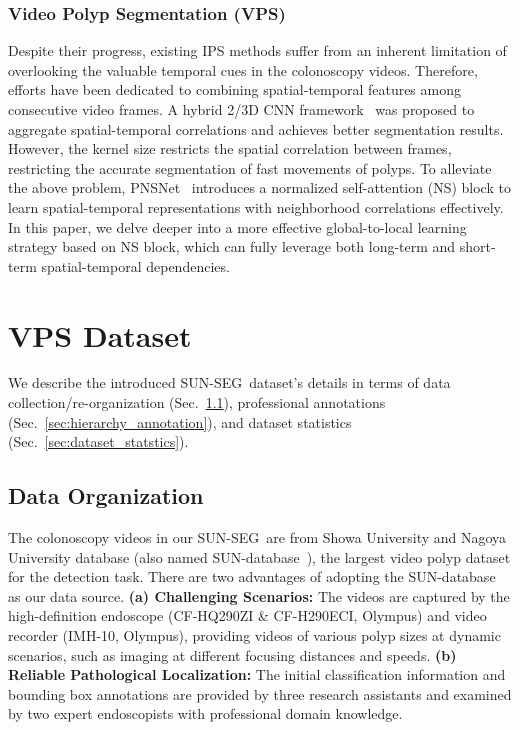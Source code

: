 \documentclass[default,iicol]{sn-jnl}
\theoremstyle{thmstyleone}
\theoremstyle{thmstyletwo}
\theoremstyle{thmstylethree}
\newcommand{\secref}[1]{Sec.~\ref{#1}}
\def\ourdataset{SUN-SEG}
\begin{document}
\subsubsection{Video Polyp Segmentation (VPS)}
Despite their progress, existing IPS methods suffer from an inherent limitation of overlooking the valuable temporal cues in the colonoscopy videos.
Therefore, efforts have been dedicated to combining spatial-temporal features among consecutive video frames.
A hybrid 2/3D CNN framework~\cite{puyal2020endoscopic} was proposed to aggregate spatial-temporal correlations and achieves better segmentation results.
However, the kernel size restricts the spatial correlation between frames, restricting the accurate segmentation of fast movements of polyps.
To alleviate the above problem, PNSNet~\cite{ji2021pnsnet} introduces a normalized self-attention (NS) block to learn spatial-temporal representations with neighborhood correlations effectively.
In this paper, we delve deeper into a more effective global-to-local learning strategy based on NS block, which can fully leverage both long-term and short-term spatial-temporal dependencies.

\section{VPS Dataset}\label{sec:dataset}
We describe the introduced \ourdataset~dataset's details in terms of data collection/re-organization (\secref{sec:data_collection}), professional annotations (\secref{sec:hierarchy_annotation}), and dataset statistics (\secref{sec:dataset_statstics}).

\subsection{Data Organization}\label{sec:data_collection}
The colonoscopy videos in our \ourdataset~are from Showa University and Nagoya University database (also named SUN-database~\cite{misawa2020development}), the largest video polyp dataset for the detection task.
There are two advantages of adopting the SUN-database as our data source.
\textbf{(a) Challenging Scenarios:} 
The videos are captured by the high-definition endoscope (CF-HQ290ZI \& CF-H290ECI, Olympus) and video recorder (IMH-10, Olympus), providing videos of various polyp sizes at dynamic scenarios, such as imaging at different focusing distances and speeds.
\textbf{(b) Reliable Pathological Localization:}
The initial classification information and bounding box annotations are provided by three research assistants and examined by two expert endoscopists with professional domain knowledge.
\end{document}
